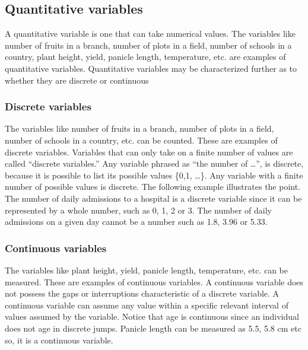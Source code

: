 \documentclass[
]{book}
\begin{document}
\hypertarget{quantitative-variables}{%
\subsection{Quantitative variables}\label{quantitative-variables}}

A quantitative variable is one that can take numerical values. The
variables like number of fruits in a branch, number of plots in a field,
number of schools in a country, plant height, yield, panicle length,
temperature, etc. are examples of quantitative variables. Quantitative
variables may be characterized further as to whether they are discrete
or continuous

\hypertarget{discrete-variables}{%
\subsubsection{Discrete variables}\label{discrete-variables}}

The variables like number of fruits in a branch, number of plots in a
field, number of schools in a country, etc. can be counted. These are
examples of discrete variables. Variables that can only take on a finite
number of values are called ``discrete variables.'' Any variable phrased
as ``the number of \ldots{}'', is discrete, because it is possible to list its
possible values \{0,1, \ldots\}. Any variable with a finite number of
possible values is discrete. The following example illustrates the
point. The number of daily admissions to a hospital is a discrete
variable since it can be represented by a whole number, such as 0, 1, 2
or 3. The number of daily admissions on a given day cannot be a number
such as 1.8, 3.96 or 5.33.

\hypertarget{continuous-variables}{%
\subsubsection{Continuous variables}\label{continuous-variables}}

The variables like plant height, yield, panicle length, temperature,
etc. can be measured. These are examples of continuous variables. A
continuous variable does not possess the gaps or interruptions
characteristic of a discrete variable. A continuous variable can assume
any value within a specific relevant interval of values assumed by the
variable. Notice that age is continuous since an individual does not age
in discrete jumps. Panicle length can be measured as 5.5, 5.8 cm etc so,
it is a continuous variable.
\end{document}
